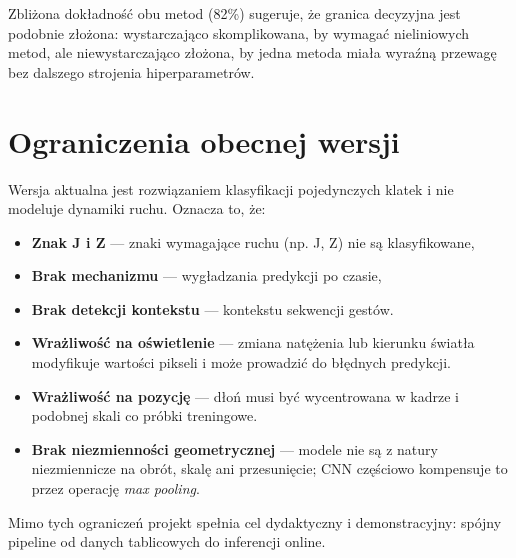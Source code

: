 Zbliżona dokładność obu metod (82\%) sugeruje, że granica decyzyjna
jest podobnie złożona: wystarczająco skomplikowana, by wymagać nieliniowych
metod, ale niewystarczająco złożona, by jedna metoda miała wyraźną przewagę
bez dalszego strojenia hiperparametrów.

\section{Ograniczenia obecnej wersji}
\label{sec:ograniczenia}

Wersja aktualna jest rozwiązaniem klasyfikacji pojedynczych klatek i nie
modeluje dynamiki ruchu. Oznacza to, że:
\begin{itemize}
    \item \textbf{Znak J i Z} --- znaki wymagające ruchu (np. J, Z) nie są klasyfikowane,
    \item \textbf{Brak mechanizmu} ---  wygładzania predykcji po czasie,
    \item \textbf{Brak detekcji kontekstu} --- kontekstu sekwencji gestów.
    \item \textbf{Wrażliwość na oświetlenie} --- zmiana natężenia lub kierunku
    światła modyfikuje wartości pikseli i może prowadzić do błędnych
    predykcji.
    \item \textbf{Wrażliwość na pozycję} --- dłoń musi być wycentrowana w kadrze
        i podobnej skali co próbki treningowe.
    \item \textbf{Brak niezmienności geometrycznej} --- modele nie są z natury
    niezmiennicze na obrót, skalę ani przesunięcie; CNN częściowo
    kompensuje to przez operację \textit{max pooling}.
\end{itemize}

Mimo tych ograniczeń projekt spełnia cel dydaktyczny i demonstracyjny:
spójny pipeline od danych tablicowych do inferencji online.
